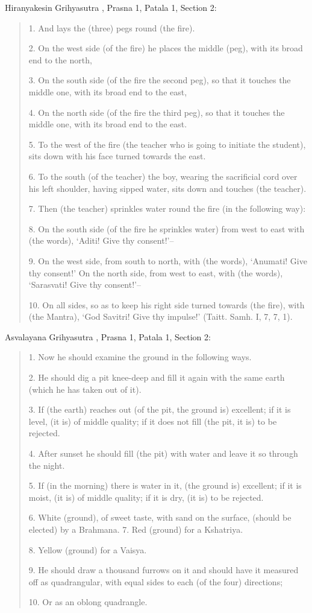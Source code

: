 \documentclass{article}
\begin{document}
Hiranyakesin Grihyasutra \cite[pp.~141--142]{grihyaII}, Prasna 1, Patala 1, Section 2:

\begin{quote}
1. And lays the (three) pegs round (the fire).

2. On the west side (of the fire) he places the middle (peg), with its broad end to the north,

3. On the south side (of the fire the second peg), so that it touches the middle one, with its broad end
to the east,

4. On the north side (of the fire the third peg), so that it touches the middle one, with its broad end
to the east.

5. To the west of the fire (the teacher who is going to initiate the student), sits down with his face
turned towards the east.

6. To the south (of the teacher) the boy, wearing the sacrificial cord over his left shoulder, having
sipped water, sits down and touches (the teacher).

7. Then (the teacher) sprinkles water round the fire (in the following way):

8. On the south side (of the fire he sprinkles water) from west to east with (the words), `Aditi! Give
thy consent!'--

9. On the west side, from south to north, with (the words), `Anumati! Give thy consent!' On the
north side, from west to east, with (the words), `Sarasvati! Give thy consent!'--

10. On all sides, so as to keep his right side turned towards (the fire), with (the Mantra), `God Savitri!
Give thy impulse!' (Taitt. Samh. I, 7, 7, 1).
\end{quote}

Asvalayana Grihyasutra \cite[p.~212]{grihyaII}, Prasna 1, Patala 1, Section 2:

\begin{quote}
1. Now he should examine the ground in the following ways.

2. He should dig a pit knee-deep and fill it again with the same earth (which he has taken out of it).

3. If (the earth) reaches out (of the pit, the ground is) excellent; if it is level, (it is) of middle quality;
if it does not fill (the pit, it is) to be rejected.

4. After sunset he should fill (the pit) with water and leave it so through the night.

5. If (in the morning) there is water in it, (the ground is) excellent; if it is moist, (it is) of middle
quality; if it is dry, (it is) to be rejected.

6. White (ground), of sweet taste, with sand on the surface, (should be elected) by a Brahmana.
7. Red (ground) for a Kshatriya.

8. Yellow (ground) for a Vaisya.

9. He should draw a thousand furrows on it and should have it measured off as quadrangular, with
equal sides to each (of the four) directions;

10. Or as an oblong quadrangle.
\end{quote}
\end{document}
